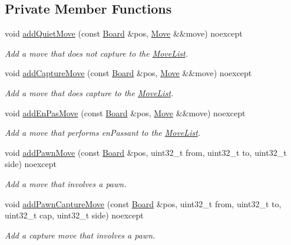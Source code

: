 \subsection*{Private Member Functions}
\begin{DoxyCompactItemize}
\item 
void \mbox{\hyperlink{classMoveList_adf7f04859cd7d9dfa7cc1790c58ce073}{add\+Quiet\+Move}} (const \mbox{\hyperlink{classBoard}{Board}} \&pos, \mbox{\hyperlink{classMove}{Move}} \&\&move) noexcept
\begin{DoxyCompactList}\small\item\em Add a move that does not capture to the \mbox{\hyperlink{classMoveList}{Move\+List}}. \end{DoxyCompactList}\item 
void \mbox{\hyperlink{classMoveList_a9ee3ce73b272288e63c3d7a0bd255bd0}{add\+Capture\+Move}} (const \mbox{\hyperlink{classBoard}{Board}} \&pos, \mbox{\hyperlink{classMove}{Move}} \&\&move) noexcept
\begin{DoxyCompactList}\small\item\em Add a move that does capture to the \mbox{\hyperlink{classMoveList}{Move\+List}}. \end{DoxyCompactList}\item 
void \mbox{\hyperlink{classMoveList_a7e381e3b0f8e9c7caf670ec470b8143d}{add\+En\+Pas\+Move}} (const \mbox{\hyperlink{classBoard}{Board}} \&pos, \mbox{\hyperlink{classMove}{Move}} \&\&move) noexcept
\begin{DoxyCompactList}\small\item\em Add a move that performs en\+Passant to the \mbox{\hyperlink{classMoveList}{Move\+List}}. \end{DoxyCompactList}\item 
void \mbox{\hyperlink{classMoveList_ae7a6441ad78b4726b986d4ea3de335b6}{add\+Pawn\+Move}} (const \mbox{\hyperlink{classBoard}{Board}} \&pos, uint32\+\_\+t from, uint32\+\_\+t to, uint32\+\_\+t side) noexcept
\begin{DoxyCompactList}\small\item\em Add a move that involves a pawn. \end{DoxyCompactList}\item 
void \mbox{\hyperlink{classMoveList_ac3af5c03221e2b73cfd7c5a4926c7b03}{add\+Pawn\+Capture\+Move}} (const \mbox{\hyperlink{classBoard}{Board}} \&pos, uint32\+\_\+t from, uint32\+\_\+t to, uint32\+\_\+t cap, uint32\+\_\+t side) noexcept
\begin{DoxyCompactList}\small\item\em Add a capture move that involves a pawn. \end{DoxyCompactList}\item 

\end{DoxyCompactItemize}
